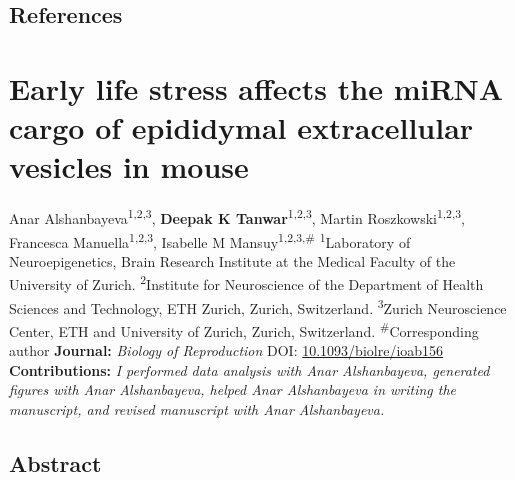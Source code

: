 \documentclass[12pt,twoside]{reedthesis}
\begin{document}
\newpage

\hypertarget{references}{%
\section{References}\label{references}}

\hypertarget{ev}{%
\chapter{Early life stress affects the miRNA cargo of epididymal extracellular vesicles in mouse}\label{ev}}

Anar Alshanbayeva\textsuperscript{1,2,3}, \textbf{Deepak K Tanwar}\textsuperscript{1,2,3}, Martin Roszkowski\textsuperscript{1,2,3}, Francesca Manuella\textsuperscript{1,2,3}, Isabelle M Mansuy\textsuperscript{1,2,3,\#}
\newline
\newline
\textsuperscript{1}Laboratory of Neuroepigenetics, Brain Research Institute at the Medical Faculty of the University of Zurich.
\newline
\textsuperscript{2}Institute for Neuroscience of the Department of Health Sciences and Technology, ETH Zurich, Zurich, Switzerland.
\newline
\textsuperscript{3}Zurich Neuroscience Center, ETH and University of Zurich, Zurich, Switzerland.
\newline
\newline
\textsuperscript{\#}Corresponding author
\newline
\newline
\textbf{Journal:} \emph{Biology of Reproduction}
\newline
DOI: \href{https://doi.org/10.1093/biolre/ioab156}{10.1093/biolre/ioab156}
\newline
\newline
\textbf{Contributions:} \emph{I performed data analysis with Anar Alshanbayeva, generated figures with Anar Alshanbayeva, helped Anar Alshanbayeva in writing the manuscript, and revised manuscript with Anar Alshanbayeva.}

\newpage

\hypertarget{abstract-2}{%
\section{Abstract}\label{abstract-2}}
\end{document}
